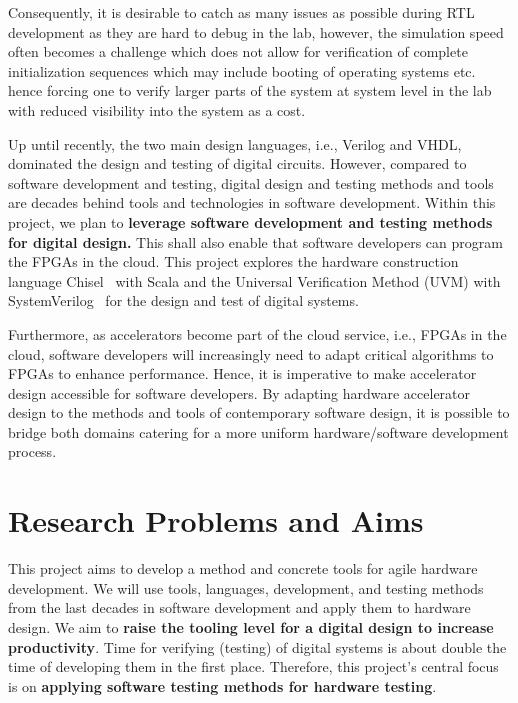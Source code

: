 \documentclass[fleqn,12pt]{article}
\newcommand{\note}[1]{{\it Note: #1}}
\begin{document}
Consequently, it is desirable to catch as many issues as possible during RTL development as they are hard to debug in the lab, however, the simulation speed often becomes a challenge which does not allow for verification of complete initialization sequences which may include booting of operating systems etc. hence forcing one to verify larger parts of the system at system level in the lab with reduced visibility into the system as a cost.

Up until recently, the two main design languages, i.e., Verilog and VHDL, dominated the
design and testing of digital circuits.
However, compared to software development and testing, digital design and testing methods
and tools are decades behind tools and technologies in software development.
Within this project, we plan to
{\bf leverage software development and testing methods for digital design.}
This shall also enable that software developers can program the FPGAs in the cloud.
This project explores the hardware construction language Chisel~\cite{chisel:dac2012} with Scala
and the Universal Verification Method (UVM) with SystemVerilog~\cite{SystemVerilog} for
the design and test of digital systems.

Furthermore, as accelerators become part of the cloud service, i.e., FPGAs in the cloud,
software developers will increasingly need to adapt critical algorithms to FPGAs to enhance performance.
Hence, it is imperative to make accelerator design accessible for software developers.
By adapting hardware accelerator design to the methods and tools of contemporary software design,
it is possible to bridge both domains catering for a more uniform hardware/software development process.


\newpage
\section*{Research Problems and Aims}


This project aims to develop a method and concrete tools for agile hardware development.
We will use tools, languages, development, and testing methods from the last decades in
software development and apply them to hardware design.
We aim to {\bf raise the tooling level for a digital design to increase productivity}.
Time for verifying (testing) of digital systems is about double the time of developing
them in the first place.
Therefore, this project's central focus is on {\bf applying software
testing methods for hardware testing}.
\end{document}
